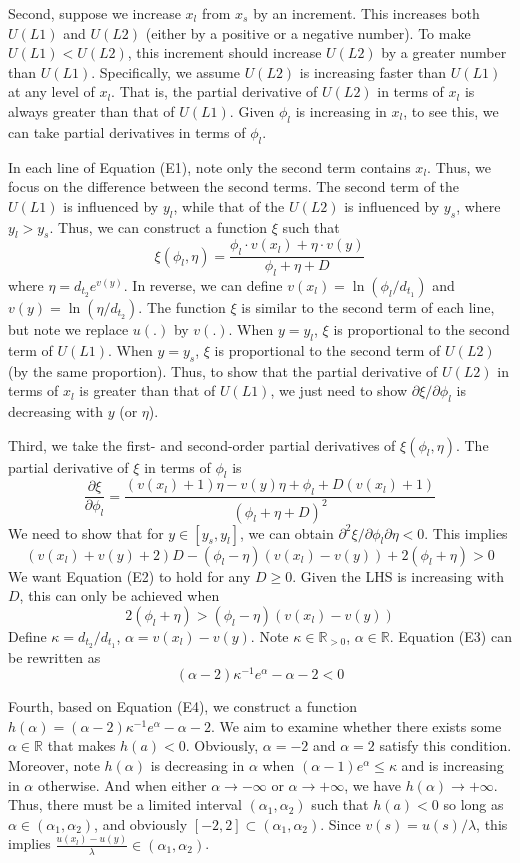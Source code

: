 \documentclass[
  12pt,
]{article}
\begin{document}
Second, suppose we increase \(x_l\) from \(x_s\) by an increment. This
increases both \(U(L1)\) and \(U(L2)\) (either by a positive or a
negative number). To make \(U(L1)<U(L2)\), this increment should
increase \(U(L2)\) by a greater number than \(U(L1)\). Specifically, we
assume \(U(L2)\) is increasing faster than \(U(L1)\) at any level of
\(x_l\). That is, the partial derivative of \(U(L2)\) in terms of
\(x_l\) is always greater than that of \(U(L1)\). Given \(\phi_l\) is
increasing in \(x_l\), to see this, we can take partial derivatives in
terms of \(\phi_l\).

In each line of Equation (E1), note only the second term contains
\(x_l\). Thus, we focus on the difference between the second terms. The
second term of the \(U(L1)\) is influenced by \(y_l\), while that of the
\(U(L2)\) is influenced by \(y_s\), where \(y_l>y_s\). Thus, we can
construct a function \(\xi\) such that\[
\xi(\phi_l,\eta) = \frac{\phi_l \cdot v(x_l)+\eta\cdot v(y)}{\phi_l+\eta+D}
\]where \(\eta=d_{t_2}e^{v(y)}\). In reverse, we can define
\(v(x_l)=\ln(\phi_l/d_{t_1})\) and \(v(y)=\ln(\eta/d_{t_2})\). The
function \(\xi\) is similar to the second term of each line, but note we
replace \(u(.)\) by \(v(.)\). When \(y=y_l\), \(\xi\) is proportional to
the second term of \(U(L1)\). When \(y=y_s\), \(\xi\) is proportional to
the second term of \(U(L2)\) (by the same proportion). Thus, to show
that the partial derivative of \(U(L2)\) in terms of \(x_l\) is greater
than that of \(U(L1)\), we just need to show
\(\partial \xi/\partial \phi_l\) is decreasing with \(y\) (or \(\eta\)).

Third, we take the first- and second-order partial derivatives of
\(\xi(\phi_l,\eta)\). The partial derivative of \(\xi\) in terms of
\(\phi_l\) is\[
\frac{\partial \xi}{\partial \phi_l}=\frac{(v(x_l)+1)\eta-v(y)\eta+\phi_l+D(v(x_l)+1)}{(\phi_l+\eta+D)^2}
\]We need to show that for \(y\in[y_s,y_l]\), we can obtain
\(\partial^2 \xi/\partial \phi_l\partial \eta<0\). This
implies\[\tag{E2}
(v(x_l)+v(y)+2)D-(\phi_l-\eta)(v(x_l)-v(y))+2(\phi_l+\eta)>0
\]We want Equation (E2) to hold for any \(D\geq 0\). Given the LHS is
increasing with \(D\), this can only be achieved when\[\tag{E3}
2(\phi_l+\eta)>(\phi_l-\eta)(v(x_l)-v(y))
\]Define \(\kappa=d_{t_2}/d_{t_1}\), \(\alpha=v(x_l)-v(y)\). Note
\(\kappa\in \mathbb{R}_{>0}\), \(\alpha\in\mathbb{R}\). Equation (E3)
can be rewritten as\[\tag{E4}
(\alpha-2)\kappa^{-1} e^{\alpha}-\alpha-2<0
\]

Fourth, based on Equation (E4), we construct a function
\(h(\alpha)=(\alpha-2)\kappa^{-1} e^\alpha-\alpha-2\). We aim to examine
whether there exists some \(\alpha\in\mathbb{R}\) that makes \(h(a)<0\).
Obviously, \(\alpha=-2\) and \(\alpha=2\) satisfy this condition.
Moreover, note \(h(\alpha)\) is decreasing in \(\alpha\) when
\((\alpha-1)e^{\alpha}\leq \kappa\) and is increasing in \(\alpha\)
otherwise. And when either \(\alpha\rightarrow -\infty\) or
\(\alpha \rightarrow +\infty\), we have
\(h(\alpha)\rightarrow +\infty\). Thus, there must be a limited interval
\((\alpha_1,\alpha_2)\) such that \(h(a)<0\) so long as
\(\alpha\in(\alpha_1,\alpha_2)\), and obviously
\([-2,2]\subset(\alpha_1,\alpha_2)\). Since \(v(s)=u(s)/\lambda\), this
implies \(\frac{u(x_l)-u(y)}{\lambda}\in(\alpha_1,\alpha_2)\).
\end{document}
